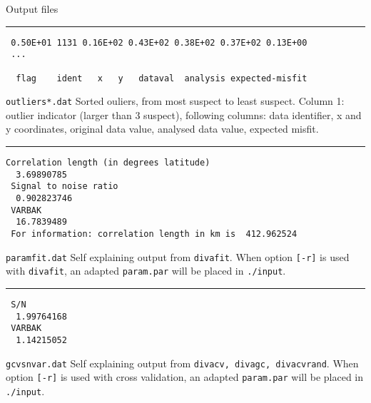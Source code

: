 \pagebreak
\clearpage
{\Huge{Output files}}
\begin{multicols}{2}
\thispagestyle{empty}


\begin{minipage}{9cm}
\rule{\textwidth}{10pt}
{\scriptsize{
\begin{verbatim}
 0.50E+01 1131 0.16E+02 0.43E+02 0.38E+02 0.37E+02 0.13E+00
 ...
 
  flag    ident   x   y   dataval  analysis expected-misfit
\end{verbatim}
}}
\makebox[\textwidth]{\hrulefill}
{{\tt outliers*.dat} Sorted ouliers, from most suspect to least suspect. Column 1: outlier indicator (larger than 3 suspect), following columns: data identifier, x and y coordinates, original data value, analysed data value, expected misfit.}
\end{minipage}

\begin{minipage}{9cm}
\rule{\textwidth}{10pt}
{\scriptsize{
\begin{verbatim}
Correlation length (in degrees latitude)
  3.69890785
 Signal to noise ratio
  0.902823746
 VARBAK
  16.7839489
 For information: correlation length in km is  412.962524
\end{verbatim}
}}
\makebox[\textwidth]{\hrulefill}
{{\tt paramfit.dat} Self explaining output from {\tt divafit}. When option {\tt [-r]} is used with {\tt divafit}, an adapted {\tt param.par} will be placed in {\tt ./input}.}
\end{minipage}

\begin{minipage}{9cm}
\rule{\textwidth}{10pt}
{\scriptsize{
\begin{verbatim}
 S/N
  1.99764168
 VARBAK
  1.14215052
\end{verbatim}
}}
\makebox[\textwidth]{\hrulefill}
{{\tt gcvsnvar.dat} Self explaining output from {\tt divacv, divagc, divacvrand}. When option {\tt [-r]} is used with cross validation, an adapted {\tt param.par} will be placed in {\tt ./input}}.
\end{minipage}

\end{multicols}

